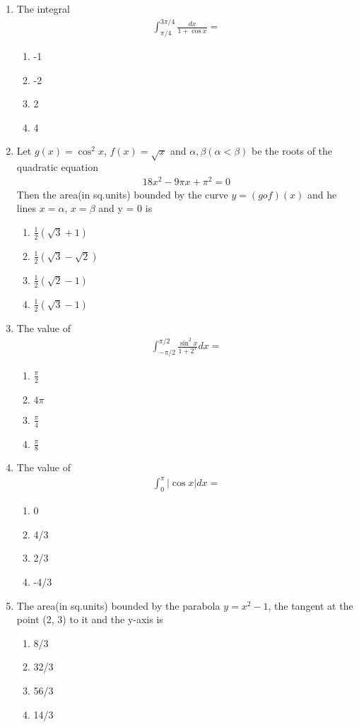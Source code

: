 \begin{enumerate}[label=\arabic*.,ref=\thesubsection.\theenumi]
\item The integral
\begin{align*}
\int_{\pi/4}^{3\pi/4}\frac{dx}{1 + \cos x} = 
\end{align*}
\begin{enumerate}
\item -1
\item -2
\item 2
\item 4
\end{enumerate}

\item Let $g(x) = \cos^{2}x$, $f(x) = \sqrt{x}$ and $\alpha, \beta (\alpha < \beta)$ be the roots of the quadratic equation
\begin{align}
18x^2 - 9\pi x + \pi^2 = 0
\end{align} 
Then the area(in sq.units) bounded by the curve $y = (gof)(x)$ and he lines $x = \alpha$, $x = \beta$ and y = 0 is
\begin{enumerate}
\item $\frac{1}{2}(\sqrt{3} + 1)$
\item $\frac{1}{2}(\sqrt{3} - \sqrt{2})$
\item $\frac{1}{2}(\sqrt{2} - 1)$
\item $\frac{1}{2}(\sqrt{3} - 1)$
\end{enumerate}

\item The value of
\begin{align*}
\int_{-\pi/2}^{\pi/2}\frac{\sin^{2}x}{1 + 2^{x}}dx = 
\end{align*}
\begin{enumerate}
\item $\frac{\pi}{2}$
\item $4\pi$
\item $\frac{\pi}{4}$
\item $\frac{\pi}{8}$
\end{enumerate}

\item The value of
\begin{align*}
\int_{0}^{\pi}|\cos x|dx = 
\end{align*}
\begin{enumerate}
\item 0
\item 4/3
\item 2/3
\item -4/3
\end{enumerate}

\item The area(in sq.units) bounded by the parabola $y = x^2 - 1$, the tangent at the point (2, 3) to it and the y-axis is
\begin{enumerate}
\item 8/3
\item 32/3
\item 56/3
\item 14/3
\end{enumerate}


\end{enumerate}
